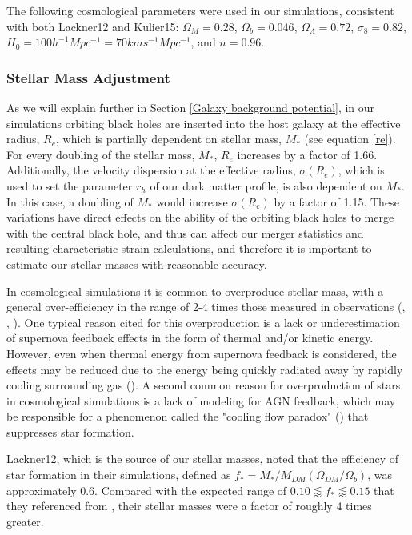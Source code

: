 \documentclass[english, apj]{emulateapj}
\begin{document}
The following cosmological parameters were used in our simulations, consistent with both Lackner12 and Kulier15:   $\Omega_M = 0.28$, $\Omega_b = 0.046$, $\Omega_\Lambda = 0.72$, $\sigma_8 = 0.82$, $H_0 = 100h^{-1}Mpc^{-1} = 70 km s^{-1} Mpc^{-1}$, and $n = 0.96$.

\subsubsection{Stellar Mass Adjustment}
As we will explain further in Section \ref{Galaxy background potential}, in our simulations orbiting black holes are inserted into the host galaxy at the effective radius, $R_e$, which is partially dependent on stellar mass, $M_*$ (see equation \ref{re}).  For every doubling of the stellar mass, $M_*$, $R_e$ increases by a factor of 1.66.  Additionally, the velocity dispersion at the effective radius, $\sigma(R_e)$, which is used to set the parameter $r_h$ of our dark matter profile, is also dependent on $M_*$.  In this case, a doubling of $M_*$ would increase $\sigma(R_e)$ by a factor of 1.15.  These variations have direct effects on the ability of the orbiting black holes to merge with the central black hole, and thus can affect our merger statistics and resulting characteristic strain calculations, and therefore it is important to estimate our stellar masses with reasonable accuracy.

In cosmological simulations it is common to overproduce stellar mass, with a general over-efficiency in the range of 2-4 times those measured in observations (\citet{1996ApJS..105...19K}, \citet{2010MNRAS.404.1111G}, \citet{2010ApJ...725.2312O}).  One typical reason cited for this overproduction is a lack or underestimation of supernova feedback effects in the form of thermal and/or kinetic energy.  However, even when thermal energy from supernova feedback is considered, the effects may be reduced due to the energy being quickly radiated away by rapidly cooling surrounding gas (\citet{1996ApJS..105...19K}).  A second common reason for overproduction of stars in cosmological simulations is a lack of modeling for AGN feedback, which may be responsible for a phenomenon called the "cooling flow paradox" (\citet{2001MNRAS.321L..20F}) that suppresses star formation. 

Lackner12, which is the source of our stellar masses, noted that the efficiency of star formation in their simulations, defined as $f_*=M_*/M_{DM}(\Omega_{DM}/\Omega_b)$, was approximately 0.6.  Compared with the expected range of $0.10 \lessapprox f_* \lessapprox 0.15$ that they referenced from \citet{2012ApJ...746...95L}, their stellar masses were a factor of roughly 4 times greater.
\end{document}
